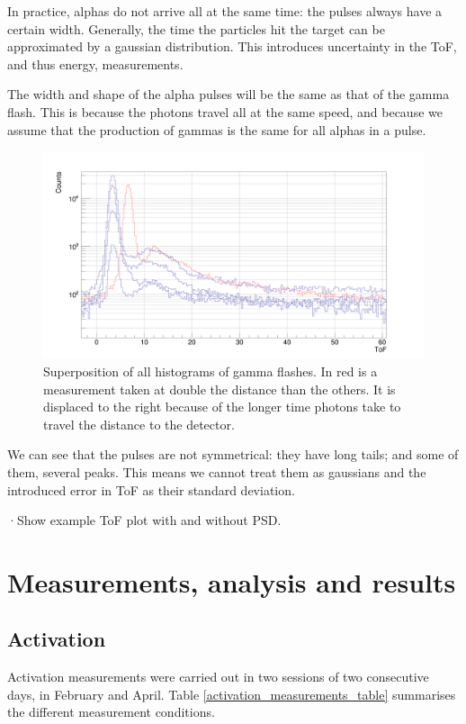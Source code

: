 \documentclass[a4paper,12pt]{report}
\begin{document}
In practice, alphas do not arrive all at the same time: the pulses always have a certain width.
Generally, the time the particles hit the target can be approximated by a gaussian distribution.
This introduces uncertainty in the ToF, and thus energy, measurements.

The width and shape of the alpha pulses will be the same as that of the gamma flash.
This is because the photons travel all at the same speed, and because we assume that the production of gammas is the same for all alphas in a pulse.
\\

\begin{figure}[H]
	\centering
	\includegraphics[width=\textwidth]{uneven_gflash.png}
	\caption{Superposition of all histograms of gamma flashes.
	In red is a measurement taken at double the distance than the others.
	It is displaced to the right because of the longer time photons take to travel the distance to the detector.}
	\label{uneven_gflash}
\end{figure}

We can see that the pulses are not symmetrical: they have long tails; and some of them, several peaks.
This means we cannot treat them as gaussians and the introduced error in ToF as their standard deviation.

·Show example ToF plot with and without PSD.\\

\chapter{Measurements, analysis and results}

\section{Activation}
Activation measurements were carried out in two sessions of two consecutive days, in February and April.
Table \ref{activation_measurements_table} summarises the different measurement conditions.
\end{document}
